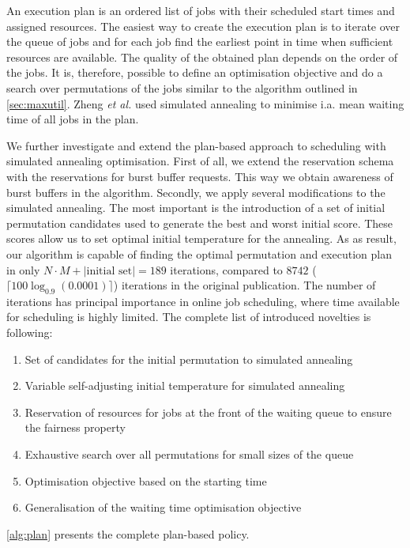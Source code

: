\documentclass[thesis-en.tex]{subfiles}
\begin{document}
An execution plan is an ordered list of jobs with their scheduled start times and assigned resources. The easiest way to create the execution plan is to iterate over the queue of jobs and for each job find the earliest point in time when sufficient resources are available. The quality of the obtained plan depends on the order of the jobs. It is, therefore, possible to define an optimisation objective and do a search over permutations of the jobs similar to the algorithm outlined in \autoref{sec:maxutil}. Zheng \textit{et al.} used simulated annealing to minimise i.a. mean waiting time of all jobs in the plan.

We further investigate and extend the plan-based approach to scheduling with simulated annealing optimisation. First of all, we extend the reservation schema with the reservations for burst buffer requests. This way we obtain awareness of burst buffers in the algorithm. Secondly, we apply several modifications to the simulated annealing. The most important is the introduction of a set of initial permutation candidates used to generate the best and worst initial score. These scores allow us to set optimal initial temperature for the annealing. As as result, our algorithm is capable of finding the optimal permutation and execution plan in only $N \cdot M + |\text{initial set}| = 189$ iterations, compared to $8742$ ($\lceil 100 \log_{0.9}(0.0001) \rceil$) iterations in the original publication. The number of iterations has principal importance in online job scheduling, where time available for scheduling is highly limited. The complete list of introduced novelties is following:
\begin{enumerate}
    \item Set of candidates for the initial permutation to simulated annealing
    \item Variable self-adjusting initial temperature for simulated annealing
    \item Reservation of resources for jobs at the front of the waiting queue to ensure the fairness property
    \item Exhaustive search over all permutations for small sizes of the queue
    \item Optimisation objective based on the starting time
    \item Generalisation of the waiting time optimisation objective
\end{enumerate}
\autoref{alg:plan} presents the complete plan-based policy.
\end{document}
